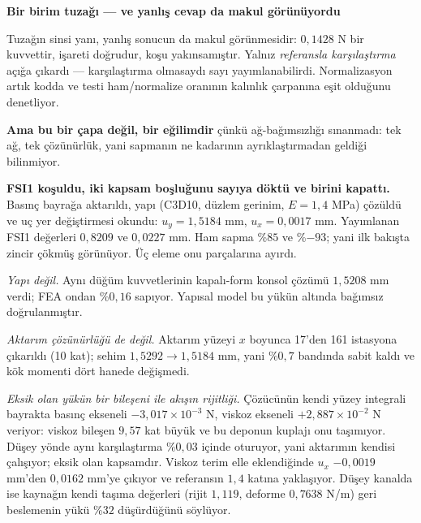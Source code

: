 \documentclass[11pt,a4paper]{article}
\newcommand{\kkkenar}{lacivert}
\newcommand{\kkzemin}{kod}
\newenvironment{renkkutu}[3]{%
  \renewcommand{\kkkenar}{#1}\renewcommand{\kkzemin}{#2}%
  \par\medskip\noindent
  \begin{lrbox}{\kutugovde}%
  \begin{minipage}{\dimexpr\linewidth-2\fboxsep-2\fboxrule\relax}\footnotesize
  \textcolor{#1}{\textbf{#3}}\par\vspace{3pt}%
}{%
  \end{minipage}%
  \end{lrbox}%
  \noindent\fcolorbox{\kkkenar}{\kkzemin}{\usebox{\kutugovde}}%
  \par\medskip
}
\newenvironment{dikkat}[1]{\begin{renkkutu}{orta}{ortabg}{#1}}{\end{renkkutu}}
\begin{document}
\begin{description}
\begin{dikkat}{Bir birim tuzağı --- ve yanlış cevap da makul görünüyordu}
        Tuzağın sinsi yanı, yanlış sonucun da makul görünmesidir: $0{,}1428$ N
        bir kuvvettir, işareti doğrudur, koşu yakınsamıştır. Yalnız
        \emph{referansla karşılaştırma} açığa çıkardı --- karşılaştırma olmasaydı
        sayı yayımlanabilirdi. Normalizasyon artık kodda ve testi ham/normalize
        oranının kalınlık çarpanına eşit olduğunu denetliyor.
        \end{dikkat}

        \noindent \textbf{Ama bu bir çapa değil, bir eğilimdir} çünkü
        ağ-bağımsızlığı sınanmadı: tek ağ, tek çözünürlük, yani sapmanın
        ne kadarının ayrıklaştırmadan geldiği bilinmiyor.

        \medskip
        \noindent \textbf{FSI1 koşuldu, iki kapsam boşluğunu sayıya döktü ve
        birini kapattı.} Basınç bayrağa aktarıldı, yapı (C3D10, düzlem
        gerinim, $E=1{,}4$ MPa) çözüldü ve uç yer değiştirmesi okundu:
        $u_y = 1{,}5184$ mm, $u_x = 0{,}0017$ mm. Yayımlanan FSI1 değerleri
        $0{,}8209$ ve $0{,}0227$ mm. Ham sapma \%$85$ ve \%$-93$; yani ilk
        bakışta zincir çökmüş görünüyor. Üç eleme onu parçalarına ayırdı.

        \noindent \emph{Yapı değil.} Aynı düğüm kuvvetlerinin kapalı-form
        konsol çözümü $1{,}5208$ mm verdi; FEA ondan \%$0{,}16$ sapıyor.
        Yapısal model bu yükün altında bağımsız doğrulanmıştır.

        \noindent \emph{Aktarım çözünürlüğü de değil.} Aktarım yüzeyi $x$
        boyunca 17'den 161 istasyona çıkarıldı (10 kat); sehim $1{,}5292 \to
        1{,}5184$ mm, yani \%$0{,}7$ bandında sabit kaldı ve kök momenti dört
        hanede değişmedi.

        \noindent \emph{Eksik olan yükün bir bileşeni ile akışın rijitliği.}
        Çözücünün kendi yüzey integrali bayrakta basınç ekseneli
        $-3{,}017{\times}10^{-3}$ N, viskoz ekseneli $+2{,}887{\times}10^{-2}$
        N veriyor: viskoz bileşen $9{,}57$ kat büyük ve bu deponun kuplajı
        onu taşımıyor. Düşey yönde aynı karşılaştırma \%$0{,}03$ içinde
        oturuyor, yani aktarımın kendisi çalışıyor; eksik olan kapsamdır.
        Viskoz terim elle eklendiğinde $u_x$ $-0{,}0019$ mm'den $0{,}0162$
        mm'ye çıkıyor ve referansın $1{,}4$ katına yaklaşıyor. Düşey kanalda
        ise kaynağın kendi taşıma değerleri (rijit $1{,}119$, deforme
        $0{,}7638$ N/m) geri beslemenin yükü \%$32$ düşürdüğünü söylüyor.


\end{description}
\end{document}
